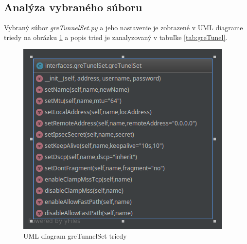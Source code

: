 \subsection{Analýza vybraného súboru}
Vybraný súbor \textit{greTunnelSet.py} a jeho nastavenie je zobrazené v UML diagrame triedy na obrázku \ref{fig:gre} a popis tried je zanalyzovaný v tabuľke \ref{tab:greTunel}.
\begin{figure}[H]
\centering
\includegraphics[scale=0.6]{../text/gre.png}
\caption{UML diagram greTunnelSet triedy}
\label{fig:gre}
\end{figure}
